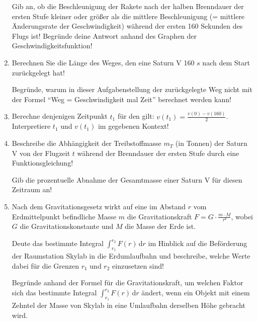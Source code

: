 \begin{langesbeispiel}
\begin{enumerate}
Gib an, ob die Beschleunigung der Rakete nach der halben Brenndauer der ersten
Stufe kleiner oder größer als die mittlere Beschleunigung (= mittlere Änderungsrate der
Geschwindigkeit) während der ersten 160 Sekunden des Flugs ist! Begründe deine Antwort anhand des Graphen der Geschwindigkeitsfunktion!

\item Berechnen Sie die Länge des Weges, den eine Saturn V 160 $s$ nach dem Start zurückgelegt hat!

Begründe, warum in dieser Aufgabenstellung der zurückgelegte Weg nicht mit der
Formel "`Weg = Geschwindigkeit mal Zeit"' berechnet werden kann!
	
\item Berechne denjenigen Zeitpunkt $t_1$ für den gilt: $v(t_1)=\frac{v(0)-v(160)}{2}$.\\
Interpretiere $t_1$ und $v(t_1)$ im gegebenen Kontext!

\item Beschreibe die Abhängigkeit der Treibstoffmasse $m_T$ (in Tonnen) der Saturn V von der Flugzeit $t$ während der Brenndauer der ersten Stufe durch eine Funktionsgleichung!

Gib die prozentuelle Abnahme der Gesamtmasse einer Saturn V für diesen Zeitraum an!

\item Nach dem Gravitationsgesetz wirkt auf eine im Abstand $r$ vom Erdmittelpunkt befindliche Masse $m$ die Gravitationskraft $F=G\cdot\frac{m\cdot M}{r²}$, wobei $G$ die Gravitationskonstante und $M$ die Masse der Erde ist.

Deute das bestimmte Integral $\int^{r_2}_{r_1}{F(r)}$\,d$r$ im Hinblick auf die Beförderung der Raumstation Skylab in die Erdumlaufbahn und beschreibe, welche Werte dabei für die Grenzen $r_1$ und $r_2$ einzusetzen sind!

Begründe anhand der Formel für die Gravitationskraft, um welchen Faktor sich das bestimmte Integral $\int^{r_2}_{r_1}{F(r)}$\,d$r$ ändert, wenn ein Objekt mit einem Zehntel der Masse von Skylab in eine Umlaufbahn derselben Höhe gebracht wird.
	
						\end{enumerate}\leer
				
\end{langesbeispiel}
